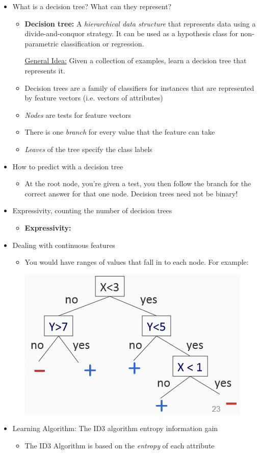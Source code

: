 \documentclass{article}
\begin{document}
\hspace{-1.5em}{\large \bf Decision Trees}
\begin{itemize}
\item What is a decision tree? What can they represent?
	\begin{itemize}
	\item {\bf Decision tree:} A {\em hierarchical data structure} that represents data using a divide-and-conquor strategy. It can be used as a hypothesis class for non-parametric classification or regression. 

	\underline{General Idea:} Given a collection of examples, learn a decision tree that represents it.
	\item Decision trees are a family of classifiers for instances that are represented by feature vectors (i.e. vectors of attributes)
	\item {\em Nodes} are tests for feature vectors
	\item There is one {\em branch} for every value that the feature can take
	\item {\em Leaves} of the tree specify the class labels
	\end{itemize}
\item How to predict with a decision tree
	\begin{itemize}
	\item At the root node, you're given a test, you then follow the branch for the correct answer for that one node. Decision trees need not be binary!
	\end{itemize}
\item Expressivity, counting the number of decision trees
	\begin{itemize}
	\item {\bf Expressivity:} 
	\end{itemize}
\item Dealing with continuous features
	\begin{itemize}
	\item You would have ranges of values that fall in to each node. For example:
	\begin{center}
	\includegraphics[width=.3\textwidth]{continuous.png}
	\end{center}
	\end{itemize}
\item Learning Algorithm: The ID3 algorithm entropy information gain
	\begin{itemize}
	\item The ID3 Algorithm is based on the {\em entropy} of each attribute


\end{itemize}
\end{itemize}
\end{document}
